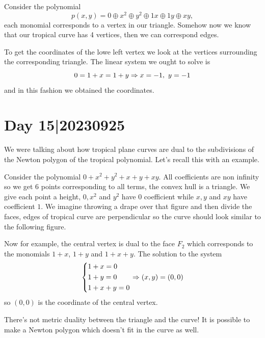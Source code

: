 \documentclass[12pt]{memoir}
\begin{document}
\begin{Ex}
    Consider the polynomial
    $$p(x,y)=0\oplus x^2\oplus y^2\oplus 1x\oplus 1y\oplus xy,$$
    each monomial corresponds to a vertex in our triangle. Somehow now we know that our tropical curve has 4 vertices, then we can correspond edges.\par 
    To get the coordinates of the lowe left vertex we look at the vertices surrounding the corresponding triangle. The linear system we ought to solve is 
    $$0=1+x=1+y\To x=-1,\ y=-1$$
    and in this fashion we obtained the coordinates. 
\end{Ex}

\section{Day 15|20230925}

We were talking about how tropical plane curves are dual to the subdivisions of the Newton polygon of the tropical polynomial. Let's recall this with an example. 

\begin{Ex}
    Consider the polynomial $0+x^2+y^2+x+y+xy$. All coefficients are non infinity so we get 6 points corresponding to all terms, the convex hull is a triangle. We give each point a height, $0,x^2$ and $y^2$ have $0$ coefficient while $x,y$ and $xy$ have coefficient $1$. We imagine throwing a drape over that figure and then divide the faces, edges of tropical curve are perpendicular so the curve should look similar to the following figure.\par
    \par 
    Now for example, the central vertex is dual to the face $F_2$ which corresponds to the monomials $1+x$, $1+y$ and $1+x+y$. The solution to the system 
    $$
    \left\lbrace
    \begin{aligned}
        &1+x=0\\
        &1+y=0\\
        &1+x+y=0\\
    \end{aligned}
    \right.
    \Rightarrow (x,y)=(0,0)
    $$
    so $(0,0)$ is the coordinate of the central vertex.
\end{Ex}

\begin{Rmk}
There's not metric duality between the triangle and the curve! It is possible to make a Newton polygon which doesn't fit in the curve as well.
\end{Rmk}
\end{document}

